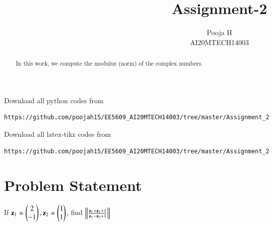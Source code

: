 \documentclass[journal,12pt,twocolumn]{IEEEtran}
\begin{document}
\let\vec\mathbf
\renewcommand{\thefigure}{\theproblem}
\def\putbox#1#2#3{\makebox[0in][l]{\makebox[#1][l]{}\raisebox{\baselineskip}[0in][0in]{\raisebox{#2}[0in][0in]{#3}}}}
     \def\rightbox#1{\makebox[0in][r]{#1}}
     \def\centbox#1{\makebox[0in]{#1}}
     \def\topbox#1{\raisebox{-\baselineskip}[0in][0in]{#1}}
     \def\midbox#1{\raisebox{-0.5\baselineskip}[0in][0in]{#1}}
\vspace{3cm}
\title{Assignment-2}
\author{Pooja H \\ AI20MTECH14003}
\maketitle
\newpage
\bigskip
\renewcommand{\thefigure}{\theenumi}
\renewcommand{\thetable}{\theenumi}
\begin{abstract}
In this work, we compute the modulus (norm) of the complex numbers.
\end{abstract}
Download all python codes from 
\begin{lstlisting}
https://github.com/poojah15/EE5609_AI20MTECH14003/tree/master/Assignment_2
\end{lstlisting}
Download all latex-tikz codes from 
\begin{lstlisting}
https://github.com/poojah15/EE5609_AI20MTECH14003/tree/master/Assignment_2
\end{lstlisting}


\section{Problem Statement}
If $\vec{z}_1 = \myvec{2 \\ -1}, \vec{z}_2 = \myvec{1 \\ 1}$, find $\norm{\frac{\vec{z}_1 + \vec{z}_1 + 1}{\vec{z}_1-\vec{z}_2+1}}$ 
\end{document}
